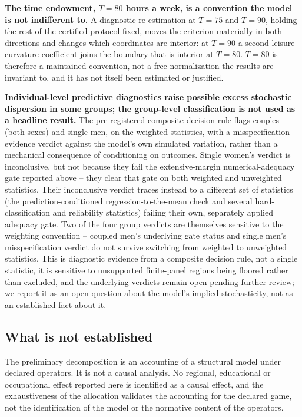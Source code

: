 \documentclass[11pt,a4paper]{article}
\begin{document}
\textbf{The time endowment, \(T=80\) hours a week, is a convention the model is not indifferent to.} A diagnostic re-estimation at \(T=75\) and \(T=90\), holding the rest of the certified protocol fixed, moves the criterion materially in both directions and changes which coordinates are interior: at \(T=90\) a second leisure-curvature coefficient joins the boundary that is interior at \(T=80\). \(T=80\) is therefore a maintained convention, not a free normalization the results are invariant to, and it has not itself been estimated or justified.

\textbf{Individual-level predictive diagnostics raise possible excess stochastic dispersion in some groups; the group-level classification is not used as a headline result.} The pre-registered composite decision rule flags couples (both sexes) and single men, on the weighted statistics, with a misspecification-evidence verdict against the model's own simulated variation, rather than a mechanical consequence of conditioning on outcomes. Single women's verdict is inconclusive, but not because they fail the extensive-margin numerical-adequacy gate reported above -- they clear that gate on both weighted and unweighted statistics. Their inconclusive verdict traces instead to a different set of statistics (the prediction-conditioned regression-to-the-mean check and several hard-classification and reliability statistics) failing their own, separately applied adequacy gate. Two of the four group verdicts are themselves sensitive to the weighting convention -- coupled men's underlying gate status and single men's misspecification verdict do not survive switching from weighted to unweighted statistics. This is diagnostic evidence from a composite decision rule, not a single statistic, it is sensitive to unsupported finite-panel regions being floored rather than excluded, and the underlying verdicts remain open pending further review; we report it as an open question about the model's implied stochasticity, not as an established fact about it.

\subsection{What is not established}\label{what-is-not-established}

The preliminary decomposition is an accounting of a structural model under declared operators. It is not a causal analysis. No regional, educational or occupational effect reported here is identified as a causal effect, and the exhaustiveness of the allocation validates the accounting for the declared game, not the identification of the model or the normative content of the operators.
\end{document}
